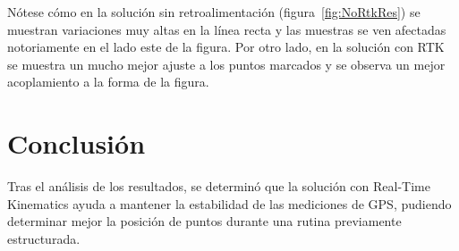 Nótese cómo en la solución sin retroalimentación (figura~\ref{fig:NoRtkRes}) se muestran variaciones muy altas en la línea recta y las muestras se ven afectadas notoriamente en el lado este de la figura. Por otro lado, en la solución con RTK se muestra un mucho mejor ajuste a los puntos marcados y se observa un mejor acoplamiento a la forma de la figura.

\section{Conclusión}
Tras el análisis de los resultados, se determinó que la solución con Real-Time Kinematics ayuda a mantener la estabilidad de las mediciones de GPS, pudiendo determinar mejor la posición de puntos durante una rutina previamente estructurada.